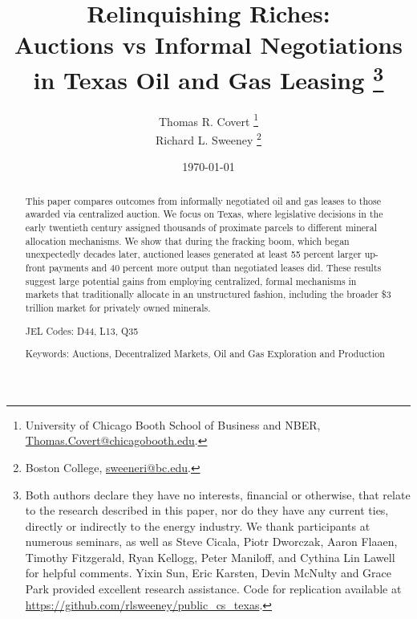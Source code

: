 \documentclass[12pt]{article}
\begin{document}
\title{Relinquishing Riches: \\ Auctions vs Informal Negotiations \\ in Texas Oil and Gas Leasing
\thanks{Both authors declare they have no interests, financial or otherwise, that relate to the research described in this paper, nor do they have any current ties, directly or indirectly to the energy industry. We thank participants at numerous seminars, as well as Steve Cicala, Piotr Dworczak, Aaron Flaaen, Timothy Fitzgerald, Ryan Kellogg, Peter Maniloff, and Cythina Lin Lawell for helpful comments.  Yixin Sun, Eric Karsten, Devin McNulty and Grace Park provided excellent research assistance. Code for replication available at \href{https://github.com/rlsweeney/public_cs_texas}{https://github.com/rlsweeney/public\_cs\_texas}.}
\vspace{10pt}}

\author{Thomas R. Covert \thanks{University of Chicago Booth School of Business and NBER, \protect\href{mailto:Thomas.Covert@chicagobooth.edu}{Thomas.Covert@chicagobooth.edu}.}
\\
 Richard L. Sweeney \thanks{Boston College, \protect\href{mailto:sweeneri@bc.edu}{sweeneri@bc.edu}.}}

\date{\today \\
 \vspace{0.5cm}
}
\maketitle
\begin{abstract}

This paper compares outcomes from informally negotiated oil and gas leases to those awarded via centralized auction. We focus on Texas, where legislative decisions in the early twentieth century assigned thousands of proximate parcels to different mineral allocation mechanisms. We show that during the fracking boom, which began unexpectedly decades later, auctioned leases generated at least 55 percent larger up-front payments and 40 percent more output than negotiated leases did.  These results suggest large potential gains from employing centralized, formal mechanisms in markets that traditionally allocate in an unstructured fashion, including the broader \$3 trillion market for privately owned minerals.

\bigskip{}

\noindent
JEL Codes: D44, L13, Q35

\medskip

\noindent
Keywords: Auctions, Decentralized Markets, Oil and Gas Exploration and Production

\bigskip{}
\end{abstract}
\setcounter{page}{1} \onehalfspace



\end{document}
